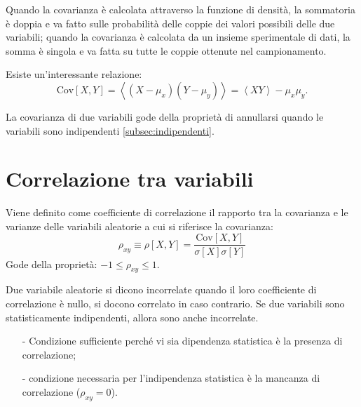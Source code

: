 Quando la covarianza è calcolata attraverso la funzione di densità, la sommatoria è doppia e va fatto sulle probabilità delle coppie dei valori possibili delle due variabili; quando la covarianza è calcolata da un insieme sperimentale di dati, la somma è singola e va fatta su tutte le coppie ottenute nel campionamento.

Esiste un'interessante relazione:
\[
\textrm{Cov} \left[ X,Y \right] =\left< \left( X-\mu _{ x } \right) \left( Y-\mu _{ y } \right)  \right> =\left< XY \right> -\mu _{ x }\mu _{ y }.
\]

La covarianza di due variabili gode della proprietà di annullarsi quando le variabili sono indipendenti \ref{subsec:indipendenti}.

\section{Correlazione tra variabili} %
\label{sec:correlazione-più-var}
Viene definito come coefficiente di correlazione il rapporto tra la covarianza e le varianze delle variabili aleatorie a cui si riferisce la covarianza:
\begin{equation}
\label{eq:correlazione}
\rho _{ xy }\equiv \rho \left[ X,Y \right] =\frac { \textrm{Cov} \left[ X,Y \right]  }{ \sigma \left[ X \right] \sigma \left[ Y \right]  } 
\end{equation}
Gode della proprietà: $-1 \le \rho_{xy} \le 1$.

Due variabile aleatorie si dicono incorrelate quando il loro coefficiente di correlazione è nullo, si docono correlato in caso contrario. Se due variabili sono statisticamente indipendenti, allora sono anche incorrelate.
\begin{itemize}
\item[-] Condizione sufficiente perché vi sia dipendenza statistica è la presenza di correlazione;
\item[-] condizione necessaria per l'indipendenza statistica è la mancanza di correlazione ($\rho_{xy}=0$).
\end{itemize}

